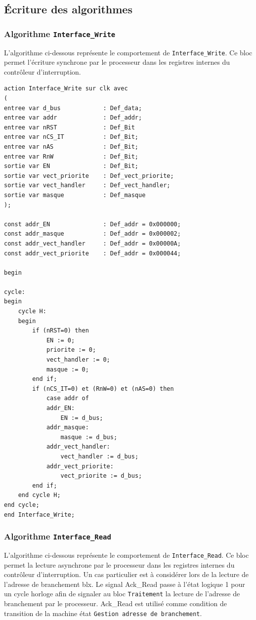 \newpage

\subsection{Écriture des algorithmes}
\subsubsection{Algorithme \texttt{Interface\_Write}}

L'algorithme ci-dessous représente le comportement de \texttt{Interface\_Write}.
Ce bloc permet l'écriture synchrone par le processeur dans les registres internes du contrôleur d'interruption. 

\begin{lstlisting}[style=pascalstyle]
action Interface_Write sur clk avec
(
entree var d_bus 			: Def_data;
entree var addr 			: Def_addr;
entree var nRST 			: Def_Bit
entree var nCS_IT 			: Def_Bit;
entree var nAS 				: Def_Bit;
entree var RnW 				: Def_Bit;
sortie var EN 				: Def_Bit;
sortie var vect_priorite 	: Def_vect_priorite;
sortie var vect_handler 	: Def_vect_handler;
sortie var masque 			: Def_masque
);

const addr_EN 				: Def_addr = 0x000000;
const addr_masque 			: Def_addr = 0x000002;
const addr_vect_handler 	: Def_addr = 0x00000A;
const addr_vect_priorite 	: Def_addr = 0x000044;

begin

cycle:
begin
	cycle H:
	begin
		if (nRST=0) then
			EN := 0;
			priorite := 0;
			vect_handler := 0;
			masque := 0;
		end if;
		if (nCS_IT=0) et (RnW=0) et (nAS=0) then
			case addr of
			addr_EN:
				EN := d_bus;
			addr_masque:
				masque := d_bus;
			addr_vect_handler:
				vect_handler := d_bus;
			addr_vect_priorite:
				vect_priorite := d_bus;
		end if;
	end cycle H;
end cycle;
end Interface_Write;
\end{lstlisting}

\newpage
\subsubsection{Algorithme \texttt{Interface\_Read}}

L'algorithme ci-dessous représente le comportement de \texttt{Interface\_Read}.
Ce bloc permet la lecture asynchrone par le processeur dans les registres internes du contrôleur d'interruption.
Un cas particulier est à considérer lors de la lecture de l'adresse de branchement blx.
Le signal Ack\_Read passe à l'état logique 1 pour un cycle horloge afin de signaler au bloc \texttt{Traitement} la lecture de l'adresse de branchement par le processeur.
Ack\_Read est utilisé comme condition de transition de la machine état \texttt{Gestion adresse de branchement}.


